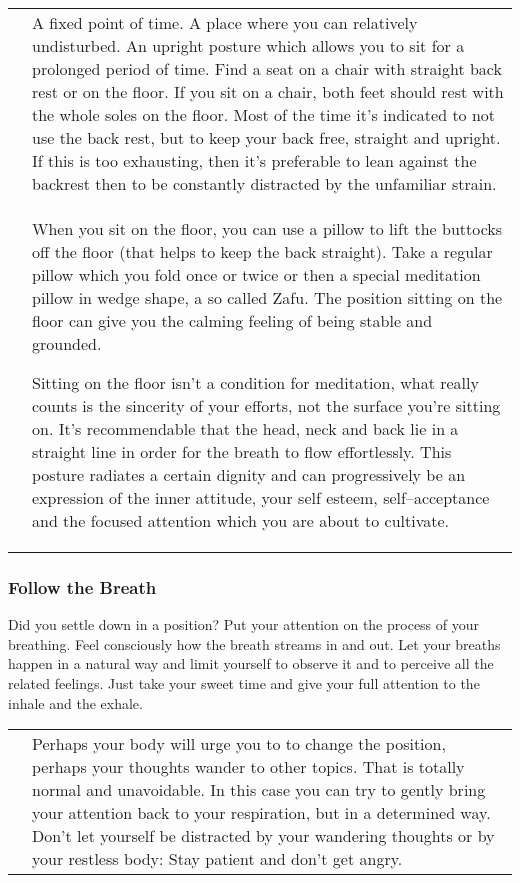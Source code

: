 \documentclass[../main.tex]{subfiles}
\begin{document}
\begin{tabular}{p{1.8cm} p{9.7cm} }
  \raisebox{-1\totalheight}{\texttt{[image: Sitting\_chair\_side]}}
  & 

 A {fixed point of time}. 
 A place where you can relatively {undisturbed}. 
 An {upright posture} which allows you to sit for a prolonged period of time.\index{meditation!posture} 
 Find a seat on a chair with straight back rest or on the floor.
    If you sit on a chair, both {feet} should rest with the whole {soles on the floor}.
    Most of the time it’s indicated to not use the back rest, but to keep your {back free, straight and upright}.
    If this is too exhausting, then it’s preferable to lean against the backrest then to be constantly distracted by the unfamiliar strain.
  \\

  \raisebox{-1.2\totalheight}{\texttt{[image: Sitting\_floor\_side]}}
  &
    When you sit on the floor, you can use a {pillow to lift the buttocks} off the floor (that helps to keep the back straight).
    Take a {regular pillow} which you {fold} once or twice or then a special meditation pillow in wedge shape, a so called Zafu.
    The position sitting on the floor can give you the calming feeling of being {stable and grounded}.

    Sitting on the floor isn't a condition for meditation, what really counts is the {sincerity of your efforts}, not the surface you're sitting on.
    It's recommendable that the {head, neck and back lie in a straight line} in order for the breath to flow effortlessly.
    This posture radiates a certain dignity and can progressively be an {expression of the inner attitude,
    your self esteem, self--acceptance and the focused attention} which you are about to cultivate.
\end{tabular}

 \subsubsection{Follow the Breath}
 Did you settle down in a position? Put your attention on the {process of your breathing}.
 Feel consciously how the breath streams in and out.
 Let your breaths happen in a natural way and limit yourself to {observe it} and to {perceive all the related feelings}.
 Just take your sweet time and give your full attention to the inhale and the exhale.
 
\noindent
 \begin{tabular}{p{4.8cm} p{6.7cm} }
 \raisebox{-0.9\totalheight}{\texttt{[image: Thinking\_mandistracted]}} & 

Perhaps your body will urge you to to change the position, perhaps your {thoughts wander} to other topics.
That is totally {normal and unavoidable}.
In this case you can try to gently bring your attention back to your respiration, but in a determined way.
Don't let yourself {be distracted by your wandering thoughts} or by your restless body: {Stay patient} and don't get angry.
 \end{tabular}
\end{document}
